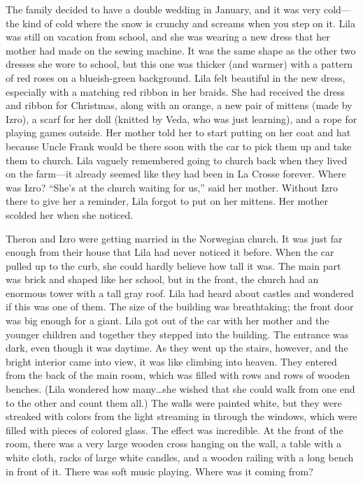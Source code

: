 \documentclass[
  letterpaper,
]{book}
\begin{document}
The family decided to have a double wedding in January, and it was very
cold---the kind of cold where the snow is crunchy and screams when you
step on it. Lila was still on vacation from school, and she was wearing
a new dress that her mother had made on the sewing machine. It was the
same shape as the other two dresses she wore to school, but this one was
thicker (and warmer) with a pattern of red roses on a blueish-green
background. Lila felt beautiful in the new dress, especially with a
matching red ribbon in her braids. She had received the dress and ribbon
for Christmas, along with an orange, a new pair of mittens (made by
Izro), a scarf for her doll (knitted by Veda, who was just learning),
and a rope for playing games outside. Her mother told her to start
putting on her coat and hat because Uncle Frank would be there soon with
the car to pick them up and take them to church. Lila vaguely remembered
going to church back when they lived on the farm---it already seemed
like they had been in La Crosse forever. Where was Izro? ``She's at the
church waiting for us,'' said her mother. Without Izro there to give her
a reminder, Lila forgot to put on her mittens. Her mother scolded her
when she noticed.

Theron and Izro were getting married in the Norwegian church. It was
just far enough from their house that Lila had never noticed it before.
When the car pulled up to the curb, she could hardly believe how tall it
was. The main part was brick and shaped like her school, but in the
front, the church had an enormous tower with a tall gray roof. Lila had
heard about castles and wondered if this was one of them. The size of
the building was breathtaking; the front door was big enough for a
giant. Lila got out of the car with her mother and the younger children
and together they stepped into the building. The entrance was dark, even
though it was daytime. As they went up the stairs, however, and the
bright interior came into view, it was like climbing into heaven. They
entered from the back of the main room, which was filled with rows and
rows of wooden benches. (Lila wondered how many\ldots she wished that
she could walk from one end to the other and count them all.) The walls
were painted white, but they were streaked with colors from the light
streaming in through the windows, which were filled with pieces of
colored glass. The effect was incredible. At the front of the room,
there was a very large wooden cross hanging on the wall, a table with a
white cloth, racks of large white candles, and a wooden railing with a
long bench in front of it. There was soft music playing. Where was it
coming from?
\end{document}
